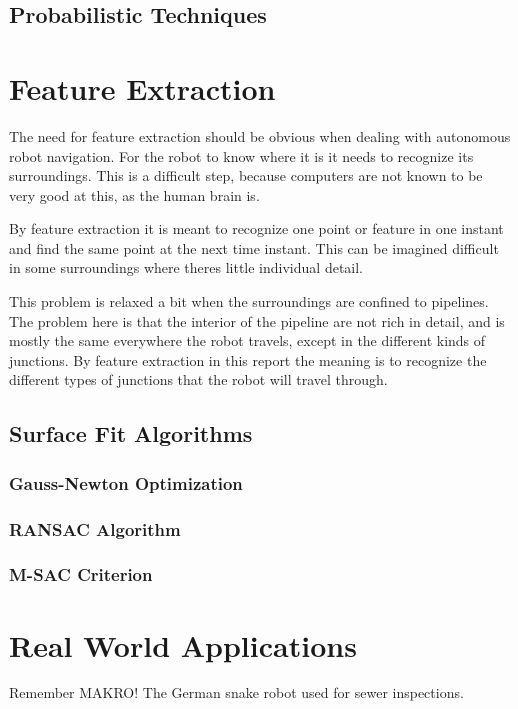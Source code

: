 \subsection{Probabilistic Techniques}



\section{Feature Extraction}
The need for feature extraction should be obvious when dealing with autonomous robot
navigation. For the robot to know where it is it needs to recognize its surroundings. This
is a difficult step, because computers are not known to be very good at this, as the human
brain is. 

By feature extraction it is meant to recognize one point or feature in one instant and
find the same point at the next time instant. This can be imagined difficult in some
surroundings where theres little individual detail. 

This problem is relaxed a bit when the surroundings are confined to pipelines. The problem
here is that the interior of the pipeline are not rich in detail, and is mostly the same
everywhere the robot travels, except in the different kinds of junctions. By feature
extraction in this report the meaning is to recognize the different types of junctions
that the robot will travel through. 
\cite{theilemann-breivik}



\subsection{Surface Fit Algorithms}


\subsubsection{Gauss-Newton Optimization}


\subsubsection{RANSAC Algorithm}


\subsubsection{M-SAC Criterion}



\section{Real World Applications}

Remember MAKRO! The German snake robot used for sewer inspections. 



